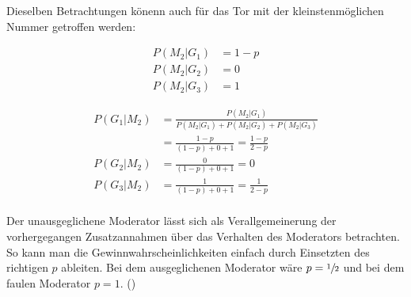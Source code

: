 Dieselben Betrachtungen könenn auch für das Tor mit der kleinstenmöglichen Nummer getroffen werden:

\begin{equation}
    \begin{split}
        P(M_2 | G_1) & = 1 - p \\
        P(M_2 | G_2) & = 0 \\
        P(M_2 | G_3) & = 1
    \end{split}
\end{equation}

\begin{equation}
    \begin{split}
        P(G_1 | M_2) & = \frac{P(M_2 | G_1)}{P(M_2 | G_1) +
            P(M_2 | G_2) + P(M_2 | G_3)} \\
        & = \frac{1-p}{(1-p)+0+1} = \frac{1-p}{2-p} \\
        P(G_2 | M_2) & = \frac{0}{(1-p)+0+1} = 0 \\
        P(G_3 | M_2) & = \frac{1}{(1-p)+0+1} = \frac{1}{2-p} \\
    \end{split}
\end{equation}


Der unausgeglichene Moderator lässt sich als Verallgemeinerung der vorhergegangen Zusatzannahmen über das Verhalten des Moderators betrachten. So kann man die Gewinnwahrscheinlichkeiten einfach durch Einsetzten des richtigen $p$ ableiten.
Bei dem ausgeglichenen Moderator wäre $p = \sfrac{1}{2}$ und bei dem faulen Moderator $p = 1$.  (\cite{Rosenthal:2008})

